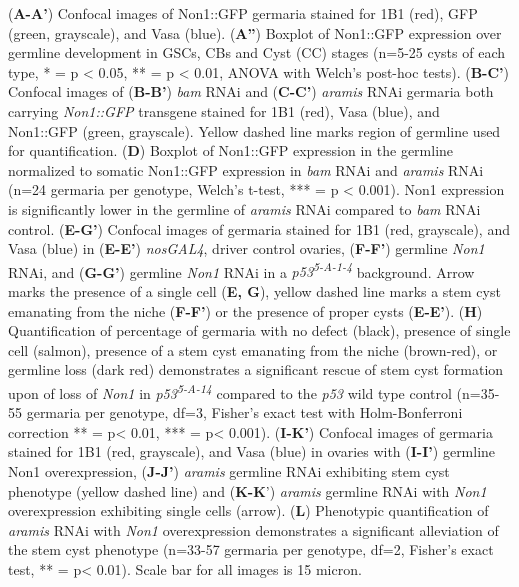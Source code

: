 \documentclass[12pt,oneside]{reedthesis}
\begin{document}
(\textbf{A-A'}) Confocal images of Non1::GFP germaria
stained for 1B1 (red), GFP (green, grayscale), and Vasa (blue).
(\textbf{A''}) Boxplot of Non1::GFP expression over germline development in
GSCs, CBs and Cyst (CC) stages (n=5-25 cysts of each type, * = p \textless{}
0.05, ** = p \textless{} 0.01, ANOVA with Welch's post-hoc tests). (\textbf{B-C'})
Confocal images of (\textbf{B-B'}) \emph{bam} RNAi and (\textbf{C-C'}) \emph{aramis} RNAi
germaria both carrying \emph{Non1::GFP} transgene stained for 1B1 (red), Vasa
(blue), and Non1::GFP (green, grayscale). Yellow dashed line marks
region of germline used for quantification. (\textbf{D}) Boxplot of Non1::GFP
expression in the germline normalized to somatic Non1::GFP expression in
\emph{bam} RNAi and \emph{aramis} RNAi (n=24 germaria per genotype, Welch's
t-test, *** = p \textless{} 0.001). Non1 expression is significantly lower in
the germline of \emph{aramis} RNAi compared to \emph{bam} RNAi control. (\textbf{E-G'})
Confocal images of germaria stained for 1B1 (red, grayscale), and Vasa
(blue) in (\textbf{E-E'}) \emph{nosGAL4}, driver control ovaries, (\textbf{F-F'})
germline \emph{Non1} RNAi, and (\textbf{G-G'}) germline \emph{Non1} RNAi in a
\emph{p53\textsuperscript{5-A-1-4}} background. Arrow marks the presence of a single cell
(\textbf{E, G}), yellow dashed line marks a stem cyst emanating from the
niche (\textbf{F-F'}) or the presence of proper cysts (\textbf{E-E'}). (\textbf{H})
Quantification of percentage of germaria with no defect (black),
presence of single cell (salmon), presence of a stem cyst emanating from
the niche (brown-red), or germline loss (dark red) demonstrates a
significant rescue of stem cyst formation upon of loss of \emph{Non1} in
\emph{p53\textsuperscript{5-A-14}} compared to the \emph{p53} wild type control (n=35-55 germaria
per genotype, df=3, Fisher's exact test with Holm-Bonferroni correction
** = p\textless{} 0.01, *** = p\textless{} 0.001). (\textbf{I-K'}) Confocal images of
germaria stained for 1B1 (red, grayscale), and Vasa (blue) in ovaries
with (\textbf{I-I'}) germline Non1 overexpression, (\textbf{J-J'}) \emph{aramis}
germline RNAi exhibiting stem cyst phenotype (yellow dashed line) and
(\textbf{K-K}') \emph{aramis} germline RNAi with \emph{Non1} overexpression exhibiting
single cells (arrow). (\textbf{L}) Phenotypic quantification of \emph{aramis} RNAi
with \emph{Non1} overexpression demonstrates a significant alleviation of the
stem cyst phenotype (n=33-57 germaria per genotype, df=2, Fisher's exact
test, ** = p\textless{} 0.01). Scale bar for all images is 15 micron.
\end{document}
